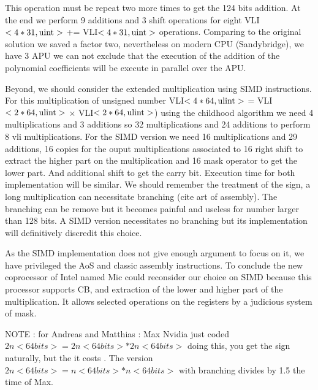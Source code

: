 \documentclass[11pt]{amsart}
\begin{document}
This operation must be repeat two more times to get the 124 bits addition. At the end we perform 9 additions and 3  shift operations for eight VLI$<4*31, \texttt{\textrm{uint}}>$ += VLI$<4*31, \texttt{\textrm{uint}}>$ operations. 
 Comparing to the original solution we saved a factor two,  nevertheless on modern CPU (Sandybridge), we have 3 APU  we can not exclude that the execution of  the addition of the polynomial coefficients will be execute in parallel over the APU. 

Beyond, we should consider the extended  multiplication using SIMD instructions. For this multiplication of unsigned number   VLI$<4*64, \texttt{\textrm{ulint}}>$  = VLI$<2*64, \texttt{\textrm{ulint}}>$ $\times$ VLI$<2*64, \texttt{\textrm{ulint}}>$) using the
childhood  algorithm we need 4 multiplications and 3 additions so 32 multiplications and 24 additions to perform 8 vli multiplications. For the SIMD version we need 16 multiplications and 29 additions, 16 copies for the ouput multiplications 
associated to 16 right shift  to extract the higher part on the multiplication and 16 mask operator to get the lower part. And additional shift to get the carry bit. Execution time for both implementation will be similar. We should remember the treatment of the sign,
 a long multiplication can necessitate branching (cite art of assembly). The branching can be remove but it  becomes painful and useless for number larger than 128 bits.  A SIMD version necessitates no branching but its implementation will
definitively discredit this choice.

As the SIMD implementation does not give enough argument to focus on it, we have privileged  the AoS and classic assembly instructions. To conclude the new coprocessor of Intel named Mic could reconsider our choice on SIMD
because this processor supports CB, and extraction of the  lower and higher part of the multiplication. It allows selected operations on the registers by a judicious system of mask.

NOTE :  for Andreas and Matthias :
Max Nvidia just coded $2n <64 bits> =  2n <64 bits>* 2n <64 bits> $ doing this, you get the sign naturally, but the it costs . The version  $2n <64 bits> =  n <64 bits> * n <64 bits>$ with branching divides by 1.5 the time of Max.
\end{document}

